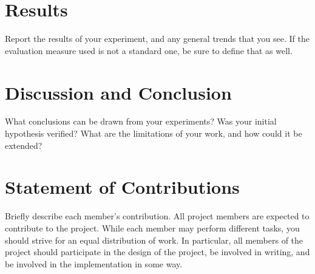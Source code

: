 \documentclass[conference]{IEEEtran}
\begin{document}
\section{Results}
Report the results of your experiment, and any general trends that you see. If the evaluation measure used is not a standard one, be sure to define that as well.

\section{Discussion and Conclusion}
What conclusions can be drawn from your experiments? Was your initial hypothesis verified? What are the limitations of your work, and how could it be extended?

\section{Statement of Contributions}
Briefly describe each member's contribution. All project members are expected to contribute to the project. While each member may perform different tasks, you should strive for an equal distribution of work. In particular, all members of the project should participate in the design of the project, be involved in writing, and be involved in the implementation in some way.
\end{document}
